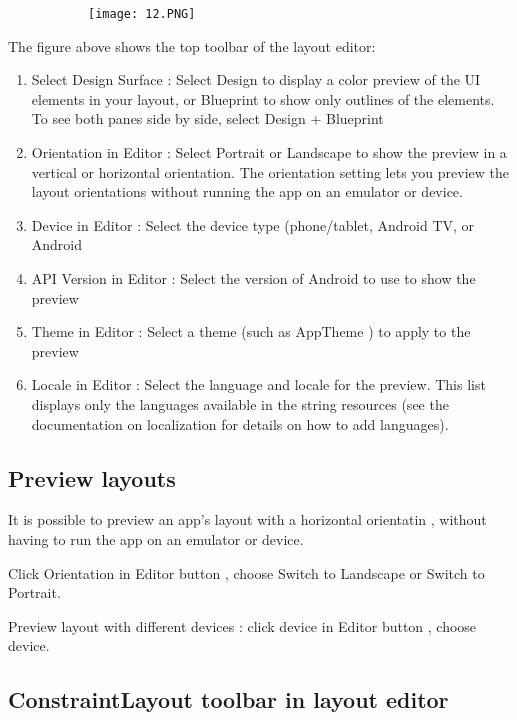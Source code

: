 \documentclass{article}
\begin{document}
      \begin{figure}[ht!]
  \centering
  \begin{subfigure}[b]{0.7\linewidth}
    \texttt{[image: 12.PNG]}
  \end{subfigure}
  \end{figure}

The figure above shows the top toolbar of the layout editor:

\begin{enumerate}
    \item Select Design Surface : Select Design to display a color preview of the UI elements
in your layout, or Blueprint to show only outlines of the elements. To see both
panes side by side, select Design + Blueprint
    \item Orientation in Editor : Select Portrait or Landscape to show the preview in a
vertical or horizontal orientation. The orientation setting lets you preview the
layout orientations without running the app on an emulator or device.
    \item Device in Editor : Select the device type (phone/tablet, Android TV, or Android
    \item API Version in Editor : Select the version of Android to use to show the preview
    \item Theme in Editor : Select a theme (such as AppTheme ) to apply to the preview
    \item Locale in Editor : Select the language and locale for the preview. This list displays only the
languages available in the string resources (see the documentation on localization for details
on how to add languages).
    
\end{enumerate}

\subsection{Preview layouts}

It is possible to preview an app's layout with a horizontal orientatin , without having to run the app on an emulator or device.

Click Orientation in Editor button , choose Switch to Landscape or Switch to Portrait.

Preview layout with different devices : click device in Editor button , choose device.

\subsection{ConstraintLayout toolbar in layout editor}
\end{document}
